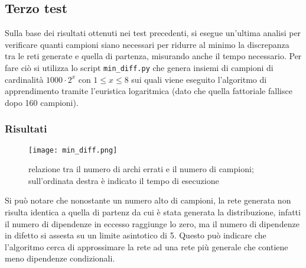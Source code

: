 \subsection{Terzo test}

Sulla base dei risultati ottenuti nei test precedenti, si esegue un'ultima analisi per verificare
quanti campioni siano necessari per ridurre al minimo la discrepanza tra le reti generate e quella
di partenza, misurando anche il tempo necessario. Per fare ciò si utilizza lo script
\texttt{min\_diff.py} che genera insiemi di campioni di cardinalità $1000 \cdot 2^x$ con $1 \le x
    \le 8$ sui quali viene eseguito l'algoritmo di apprendimento tramite l'euristica logaritmica (dato
che quella fattoriale fallisce dopo 160 campioni).

\subsubsection{Risultati}

\begin{figure}[h]
    \centering
    \texttt{[image: min\_diff.png]}
    \caption{relazione tra il numero di archi errati e il numero di campioni; sull'ordinata destra è indicato il tempo di esecuzione}
    \label{fig:test3}
\end{figure}

Si può notare che nonostante un numero alto di campioni, la rete generata non risulta identica a
quella di partenz da cui è stata generata la distribuzione, infatti il numero di dipendenze in
eccesso raggiunge lo zero, ma il numero di dipendenze in difetto si assesta su un limite asintotico
di 5. Questo può indicare che l'algoritmo cerca di approssimare la rete ad una rete più generale
che contiene meno dipendenze condizionali.
